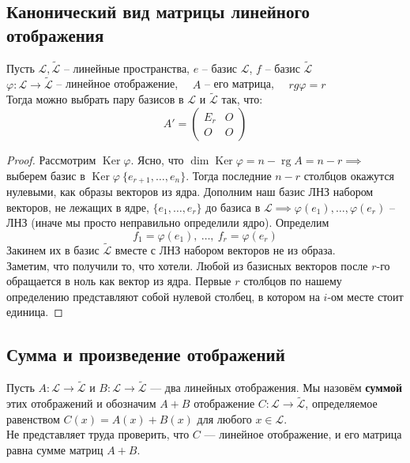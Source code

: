 \documentclass[11pt]{article}
\DeclareMathOperator{\Ker}{Ker}
\DeclareMathOperator{\rg}{rg}
\begin{document}
\subsection{Канонический вид матрицы линейного отображения}

\begin{theorem}
  Пусть $\mathcal{L}, \widetilde{\mathcal{L}}$ -- линейные пространства, $e$ -- базис $\mathcal{L}$, $f$ -- базис $\widetilde{\mathcal{L}}$ \\
  $\varphi \colon \mathcal{L} \to \widetilde{\mathcal{L}}$ -- линейное отображение, $\quad A$ -- его матрица, $\quad rg \varphi = r$ \\
  Тогда можно выбрать пару базисов в $\mathcal{L}$ и $\widetilde{\mathcal{L}}$ так, что:
  \[A' = 
  \begin{pmatrix}
    E_r & O \\
    O & O
  \end{pmatrix}\]
\end{theorem}

\begin{proof}
  Рассмотрим $\Ker \varphi$. Ясно, что $\dim \Ker \varphi = n - \rg A = n - r \implies$ 
  выберем базис в $\Ker \varphi \ \{e_{r + 1}, \dots, e_n\}$. Тогда последние $n - r$ столбцов 
  окажутся нулевыми, как образы векторов из ядра. Дополним наш базис ЛНЗ набором векторов, не лежащих в ядре, $\{e_1, \dots, e_r\}$ до базиса в $\mathcal{L}
  \implies \varphi (e_1), \dots, \varphi (e_r)$ -- ЛНЗ (иначе мы просто неправильно определили ядро). Определим \[f_1 = \varphi(e_1), \ \dots, \ f_r = \varphi(e_r)\]
  Закинем их в базис $\widetilde{\mathcal{L}}$ вместе с ЛНЗ набором векторов не из образа. \\
  Заметим, что получили то, что хотели. Любой из базисных векторов после $r \text{-го}$ обращается в ноль как вектор из ядра. 
  Первые $r$ столбцов по нашему определению представляют собой нулевой столбец, в котором на $i \text{-ом}$ месте стоит единица.
\end{proof}

\subsection{Сумма и произведение отображений}

\begin{definition}
  Пусть $A \colon \mathcal{L} \to \widetilde{\mathcal{L}}$ и $B \colon \mathcal{L} \to \widetilde{\mathcal{L}}$ --- два линейных отображения. Мы назовём \textbf{суммой}
  этих отображений и обозначим $A + B$ отображение $C \colon \mathcal{L} \to \widetilde{\mathcal{L}}$, определяемое равенством $C(x) = A(x) + B(x)$ для любого $x \in \mathcal{L}$. \\
  Не представляет труда проверить, что $C$ --- линейное отображение, и его матрица равна сумме матриц $A + B$.
\end{definition}
\end{document}
